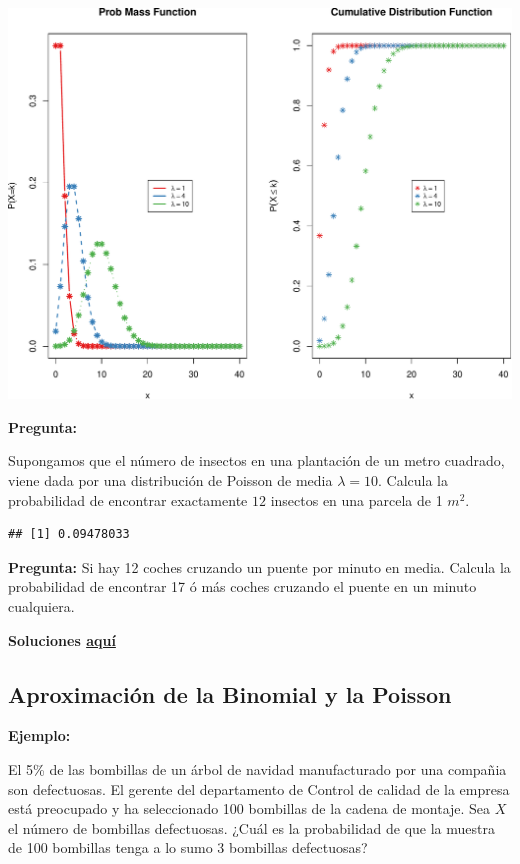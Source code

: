 \documentclass[]{article}
\numberwithin{equation}{section}
\begin{document}
\includegraphics{tema4_files/figure-latex/unnamed-chunk-6-1.pdf}

\textbf{Pregunta:}

Supongamos que el número de insectos en una plantación de un metro
cuadrado, viene dada por una distribución de Poisson de media
\(\lambda= 10\). Calcula la probabilidad de encontrar exactamente \(12\)
insectos en una parcela de 1 \(m^2\).

\begin{verbatim}
## [1] 0.09478033
\end{verbatim}

\textbf{Pregunta:} Si hay 12 coches cruzando un puente por minuto en
media. Calcula la probabilidad de encontrar 17 ó más coches cruzando el
puente en un minuto cualquiera.

\textbf{Soluciones \href{IntroSM_sol.html}{aquí}}

\subsection{Aproximación de la Binomial y la
Poisson}\label{aproximacion-de-la-binomial-y-la-poisson}

\textbf{Ejemplo:}

El 5\% de las bombillas de un árbol de navidad manufacturado por una
compañia son defectuosas. El gerente del departamento de Control de
calidad de la empresa está preocupado y ha seleccionado 100 bombillas de
la cadena de montaje. Sea \(X\) el número de bombillas defectuosas.
¿Cuál es la probabilidad de que la muestra de 100 bombillas tenga a lo
sumo 3 bombillas defectuosas?
\end{document}

